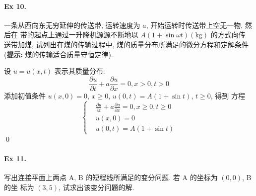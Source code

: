 \paragraph{Ex 10.}
一条从西向东无穷延伸的传送带, 运转速度为 $a$, 开始运转时传送带上空无一物, 然后在
带的起点上通过一升降机源源不断地以 $A (1 + \sin \omega t)(\text{kg})$ 的方式向传
送带加煤, 试列出在煤的传输过程中, 煤的质量分布所满足的微分方程和定解条件
({\bf 提示:} 煤的传输适合质量守恒定律).

\begin{solution}
设 $u = u(x, t)$ 表示其质量分布:
\[
\frac{\partial u}{\partial t} + a\frac{\partial u}{\partial x} = 0, x > 0, t > 0
\]
添加初值条件 $u(x, 0) = 0$, $x \geq 0$, $u(0, t) = A(1+\sin t)$, $t\geq 0$, 得到
方程
\[ \left\{ \begin{aligned} 
&\frac{\partial u}{\partial t} + a\frac{\partial u}{\partial x} = 0,
  x \geq 0, t \geq 0 \\
&u(x, 0) = 0 \\
&u(0, t) = A(1+\sin t)
\end{aligned} \right. \]
\qed
\end{solution}


\paragraph{Ex 11.}
写出连接平面上两点 A, B 的短程线所满足的变分问题. 若 A 的坐标为 $(0, 0)$, B 的坐
标为 $(3, 5)$, 试求出该变分问题的解.

